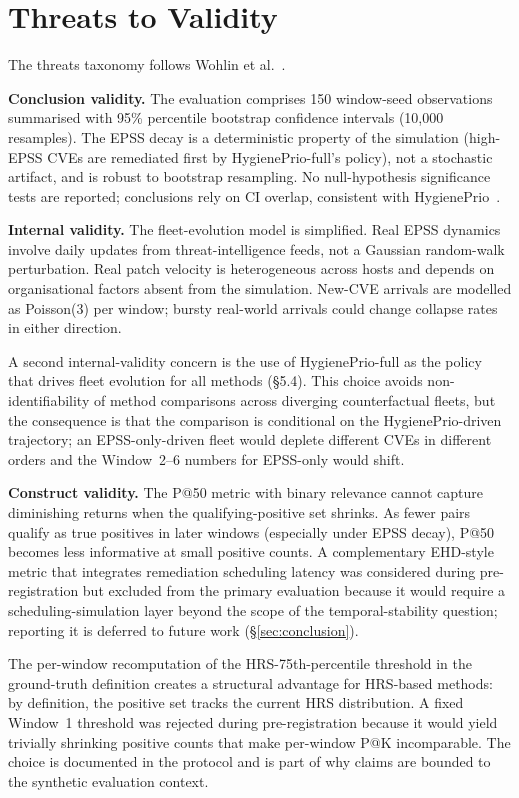 \section{Threats to Validity}
\label{sec:threats}

The threats taxonomy follows Wohlin et al.~\cite{wohlin2012experimentation}.

\textbf{Conclusion validity.} The evaluation comprises 150 window-seed observations summarised with 95\% percentile bootstrap confidence intervals (10{,}000 resamples). The EPSS decay is a deterministic property of the simulation (high-EPSS CVEs are remediated first by HygienePrio-full's policy), not a stochastic artifact, and is robust to bootstrap resampling. No null-hypothesis significance tests are reported; conclusions rely on CI overlap, consistent with HygienePrio~\cite{paper4hygieneprio}.

\textbf{Internal validity.} The fleet-evolution model is simplified. Real EPSS dynamics involve daily updates from threat-intelligence feeds, not a Gaussian random-walk perturbation. Real patch velocity is heterogeneous across hosts and depends on organisational factors absent from the simulation. New-CVE arrivals are modelled as Poisson(3) per window; bursty real-world arrivals could change collapse rates in either direction.

A second internal-validity concern is the use of HygienePrio-full as the policy that drives fleet evolution for all methods (\S5.4). This choice avoids non-identifiability of method comparisons across diverging counterfactual fleets, but the consequence is that the comparison is conditional on the HygienePrio-driven trajectory; an EPSS-only-driven fleet would deplete different CVEs in different orders and the Window~2--6 numbers for EPSS-only would shift.

\textbf{Construct validity.} The P@50 metric with binary relevance cannot capture diminishing returns when the qualifying-positive set shrinks. As fewer pairs qualify as true positives in later windows (especially under EPSS decay), P@50 becomes less informative at small positive counts. A complementary EHD-style metric that integrates remediation scheduling latency was considered during pre-registration but excluded from the primary evaluation because it would require a scheduling-simulation layer beyond the scope of the temporal-stability question; reporting it is deferred to future work (\S\ref{sec:conclusion}).

The per-window recomputation of the HRS-75th-percentile threshold in the ground-truth definition creates a structural advantage for HRS-based methods: by definition, the positive set tracks the current HRS distribution. A fixed Window~1 threshold was rejected during pre-registration because it would yield trivially shrinking positive counts that make per-window P@K incomparable. The choice is documented in the protocol and is part of why claims are bounded to the synthetic evaluation context.

